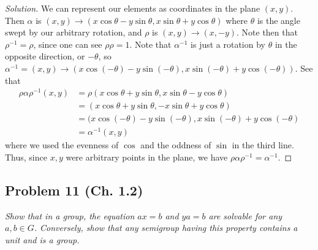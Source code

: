 \documentclass{article}
\begin{document}
\begin{proof}[Solution]\let\qed\relax
	We can represent our elements as coordinates in the plane $(x,y)$.
	Then $\alpha$ is $(x,y) \to (x\cos\theta - y\sin\theta, x\sin\theta + y\cos\theta)$
	where $\theta$ is the angle swept by our arbitrary rotation,
	and $\rho$ is $(x,y) \to (x,-y)$.
	Note then that $\rho^{-1} = \rho$, since one can see $\rho\rho = 1$.
	Note that $\alpha^{-1}$ is just a rotation by $\theta$ in the opposite direction,
	or $-\theta$, so $\alpha^{-1} = (x,y) \to (x\cos(-\theta) - y\sin(-\theta),
	x\sin(-\theta) + y\cos(-\theta))$.
	See that 
	\begin{align*}
		\rho \alpha \rho^{-1}(x,y)
		&= \rho(x\cos\theta + y\sin\theta, x\sin\theta - y \cos\theta)\\
		&= (x\cos\theta + y\sin\theta, -x\sin\theta + y \cos\theta)\\
		&= (x\cos(-\theta) - y\sin(-\theta), x\sin(-\theta) + y\cos(-\theta)\\
		&= \alpha^{-1}(x,y)
	\end{align*}
	where we used the evenness of $\cos$ and the oddness of $\sin$ in the third line.
	Thus, since $x,y$ were arbitrary points in the plane,
	we have $\rho\alpha\rho^{-1} = \alpha^{-1}$.
\end{proof}

\subsection*{Problem 11 (Ch. 1.2)}
{\it Show that in a group, the equation $ax = b$ and $ya = b$
are solvable for any $a,b \in G$.
Conversely, show that any semigroup having this property contains a unit and is a group.}
\end{document}
